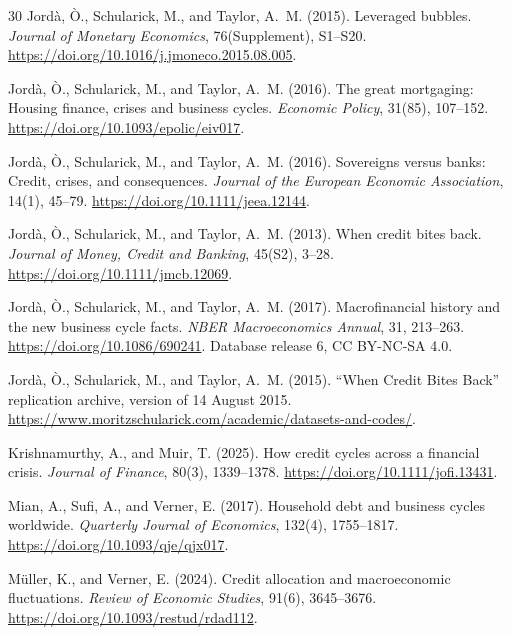\documentclass[11pt]{article}
\begin{document}
\begin{thebibliography}{30}
Jord\`a, \`O., Schularick, M., and Taylor, A.~M. (2015).
\newblock Leveraged bubbles.
\newblock \emph{Journal of Monetary Economics}, 76(Supplement), S1--S20.
\newblock \url{https://doi.org/10.1016/j.jmoneco.2015.08.005}.

Jord\`a, \`O., Schularick, M., and Taylor, A.~M. (2016).
\newblock The great mortgaging: Housing finance, crises and business cycles.
\newblock \emph{Economic Policy}, 31(85), 107--152.
\newblock \url{https://doi.org/10.1093/epolic/eiv017}.

Jord\`a, \`O., Schularick, M., and Taylor, A.~M. (2016).
\newblock Sovereigns versus banks: Credit, crises, and consequences.
\newblock \emph{Journal of the European Economic Association}, 14(1), 45--79.
\newblock \url{https://doi.org/10.1111/jeea.12144}.

Jord\`a, \`O., Schularick, M., and Taylor, A.~M. (2013).
\newblock When credit bites back.
\newblock \emph{Journal of Money, Credit and Banking}, 45(S2), 3--28.
\newblock \url{https://doi.org/10.1111/jmcb.12069}.

Jord\`a, \`O., Schularick, M., and Taylor, A.~M. (2017).
\newblock Macrofinancial history and the new business cycle facts.
\newblock \emph{NBER Macroeconomics Annual}, 31, 213--263.
\newblock \url{https://doi.org/10.1086/690241}. Database release 6, CC BY-NC-SA 4.0.

Jord\`a, \`O., Schularick, M., and Taylor, A.~M. (2015).
\newblock ``When Credit Bites Back'' replication archive, version of 14 August 2015.
\newblock \url{https://www.moritzschularick.com/academic/datasets-and-codes/}.

Krishnamurthy, A., and Muir, T. (2025).
\newblock How credit cycles across a financial crisis.
\newblock \emph{Journal of Finance}, 80(3), 1339--1378.
\newblock \url{https://doi.org/10.1111/jofi.13431}.

Mian, A., Sufi, A., and Verner, E. (2017).
\newblock Household debt and business cycles worldwide.
\newblock \emph{Quarterly Journal of Economics}, 132(4), 1755--1817.
\newblock \url{https://doi.org/10.1093/qje/qjx017}.

M\"uller, K., and Verner, E. (2024).
\newblock Credit allocation and macroeconomic fluctuations.
\newblock \emph{Review of Economic Studies}, 91(6), 3645--3676.
\newblock \url{https://doi.org/10.1093/restud/rdad112}.


\end{thebibliography}
\end{document}
